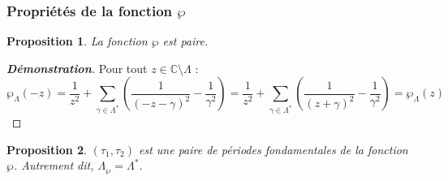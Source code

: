 \documentclass[12pt]{article}
\newtheorem{proposition}{Proposition}
\begin{document}
            \subsubsection{Propriétés de la fonction \(\wp\)}

            \begin{proposition}
            La fonction \(\wp\) est paire.
            \end{proposition}

            \begin{proof}[\textbf{Démonstration}]
            Pour tout \(z \in \mathbb{C} \setminus \Lambda\) :
            \[
            \wp_\Lambda(-z) = \frac{1}{z^2} + \sum_{\gamma \in \Lambda^*} \left( \frac{1}{(-z - \gamma)^2} - \frac{1}{\gamma^2} \right)
            = \frac{1}{z^2} + \sum_{\gamma \in \Lambda^*} \left( \frac{1}{(z + \gamma)^2} - \frac{1}{\gamma^2} \right)
            = \wp_\Lambda(z)
            \]
            \end{proof}

            \begin{proposition}
            \((\tau_1, \tau_2)\) est une paire de périodes fondamentales de la fonction \(\wp\). Autrement dit, \(\Lambda_{\wp} = \Lambda^*\).
            \end{proposition}
\end{document}
